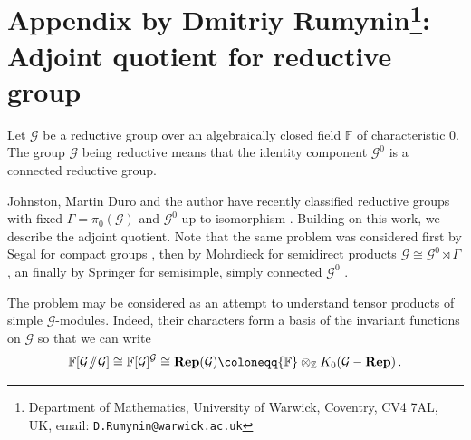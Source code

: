 \documentclass[10pt]{article}
\newcommand{\Rep}{\mathbf{Rep}}
\theoremstyle{definition}
\theoremstyle{remark}
\newcommand{\bF}{{\mathbb F}}
\newcommand{\bZ}{{\mathbb Z}}
\newcommand{\cG}{{{\mathcal G}}}
\newcommand{\sslash}{\mathbin{/\mkern-6mu/}}
\newcommand{\GG}{{\cG\!\sslash\! \cG}}
\begin{document}
\appendix
\section{Appendix by Dmitriy Rumynin\footnote[2]{Department of Mathematics, University of Warwick, 
Coventry, CV4 7AL, UK, email: \texttt{D.Rumynin@warwick.ac.uk}}: Adjoint quotient for reductive group}


\setcounter{lem}{0}
\setcounter{prop}{0}
\setcounter{cor}{0}
\renewcommand{\thelem}{\Alph{section}\arabic{lem}}
\renewcommand{\theprop}{\Alph{section}\arabic{prop}}
\renewcommand{\thecor}{\Alph{section}\arabic{cor}}


\begin{abstract}
We describe the GIT quotient $\GG$ for a disconnected reductive group $\cG$
  over an algebraically closed field of characteristic zero acting on itself by conjugation.
\end{abstract}


Let $\cG$ be a reductive group over an algebraically closed field $\bF$ of characteristic $0$.
The group $\cG$ being reductive means that the identity component $\cG^0$ is
a connected reductive group.

Johnston, Martin Duro and the author have recently
classified reductive groups with fixed $\Gamma = \pi_0 (\cG)$ and $\cG^0$ up to isomorphism \cite{JMR}.
Building on this work, we describe the adjoint quotient. Note that the same problem was considered
first by Segal for compact groups \cite{Segal}, then by Mohrdieck for semidirect products 
$\cG\cong \cG^0 \rtimes \Gamma$ \cite{diss}, an finally by Springer for semisimple, simply connected
$\cG^0$ \cite{Spr}.

The problem may be considered as an attempt to understand tensor products of simple $\cG$-modules. Indeed, their characters form a basis of the invariant functions on $\cG$ so that we can write
\[
\bF [\GG] \cong \bF[\cG]^{\cG}
\cong \Rep (\cG) \coloneqq \bF \otimes_{\bZ} K_0( \cG-\Rep) \, .
\]

\end{document}
